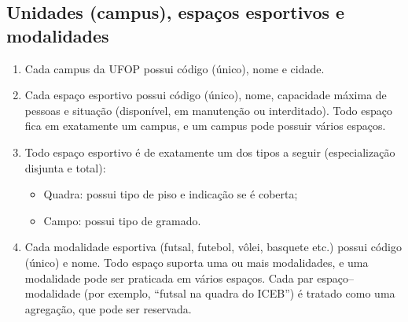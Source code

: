 \documentclass[11pt,a4paper]{article}
\begin{document}
\subsection{Unidades (campus), espaços esportivos e modalidades}
\begin{enumerate}[resume*=req]
  \item Cada campus da UFOP possui código (único), nome e cidade.
  \item Cada espaço esportivo possui código (único), nome, capacidade
        máxima de pessoas e situação (disponível, em manutenção ou interditado).
        Todo espaço fica em exatamente um campus, e um campus pode possuir
        vários espaços.
  \item Todo espaço esportivo é de exatamente um dos tipos a seguir
        (especialização disjunta e total):
        \begin{itemize}
          \item Quadra: possui tipo de piso e indicação se é coberta;
          \item Campo: possui tipo de gramado.
        \end{itemize}
  \item Cada modalidade esportiva (futsal, futebol, vôlei, basquete etc.)
        possui código (único) e nome. Todo espaço suporta uma ou mais
        modalidades, e uma modalidade pode ser praticada em vários espaços.
        Cada par espaço--modalidade (por exemplo, ``futsal na quadra do
        ICEB'') é tratado como uma agregação, que pode ser reservada.
\end{enumerate}
\end{document}
